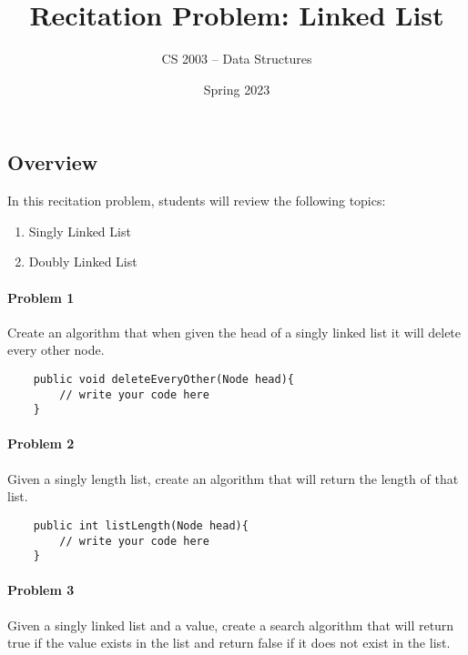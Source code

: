 \documentclass[letterpaper]{article}
\title{Recitation Problem: Linked List}
\author{CS 2003 -- Data Structures}
\date{Spring 2023}
\begin{document}


\maketitle




\subsection*{Overview}

In this recitation problem, students will review the following topics:

\begin{enumerate}
\item Singly Linked List
\item Doubly Linked List
\end{enumerate}

\vspace{0.5em}

\paragraph{Problem 1} Create an algorithm that when given the head of a singly linked list it will delete every other node. 

\begin{verbatim}
    public void deleteEveryOther(Node head){
        // write your code here
    }
\end{verbatim}

\paragraph{Problem 2} Given a singly length list, create an algorithm that will return the length of that list.

\begin{verbatim}
    public int listLength(Node head){
        // write your code here
    }
\end{verbatim}

\paragraph{Problem 3} Given a singly linked list and a value, create a search algorithm that will return true if the value exists in the list and return false if it does not exist in the list.
\end{document}
